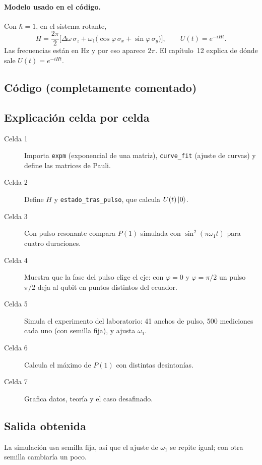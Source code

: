 \paragraph{Modelo usado en el código.} Con $\hbar=1$, en el sistema rotante,
\begin{equation}
  H=\frac{2\pi}{2}\Big[\Delta\omega\,\sigma_z+\omega_1\big(\cos\varphi\,\sigma_x
  +\sin\varphi\,\sigma_y\big)\Big],\qquad U(t)=e^{-iHt}.
\end{equation}
Las frecuencias están en Hz y por eso aparece $2\pi$. El capítulo~12 explica
de dónde sale $U(t)=e^{-iHt}$.

\subsection{Código (completamente comentado)}


\subsection{Explicación celda por celda}
\begin{description}
  \item[Celda 1] Importa \texttt{expm} (exponencial de una matriz),
    \texttt{curve\_fit} (ajuste de curvas) y define las matrices de Pauli.
  \item[Celda 2] Define $H$ y \texttt{estado\_tras\_pulso}, que calcula
    $U(t)\left|0\right\rangle$.
  \item[Celda 3] Con pulso resonante compara $P(1)$ simulada con
    $\sin^2(\pi\omega_1t)$ para cuatro duraciones.
  \item[Celda 4] Muestra que la fase del pulso elige el eje: con
    $\varphi=0$ y $\varphi=\pi/2$ un pulso $\pi/2$ deja al qubit en puntos
    distintos del ecuador.
  \item[Celda 5] Simula el experimento del laboratorio: 41 anchos de pulso,
    500 mediciones cada uno (con semilla fija), y ajusta $\omega_1$.
  \item[Celda 6] Calcula el máximo de $P(1)$ con distintas desintonías.
  \item[Celda 7] Grafica datos, teoría y el caso desafinado.
\end{description}

\subsection{Salida obtenida}

La simulación usa semilla fija, así que el ajuste de $\omega_1$ se repite
igual; con otra semilla cambiaría un poco.


